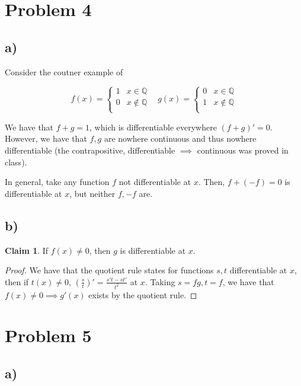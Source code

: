 \documentclass[12pt,letterpaper]{article}
\theoremstyle{definition}
\newtheorem*{claim}{Claim}
\newcommand{\Q}{\mathbb{Q}}
\begin{document}
\section*{Problem 4}

\subsection*{a)}

Consider the coutner example of

\[
  f(x) = \begin{cases}
    1 & x \in \Q \\
    0 & x \notin \Q \\
  \end{cases}
  \ \ \ \ 
  g(x) = \begin{cases}
    0 & x \in \Q \\
    1 & x \notin \Q \\
  \end{cases}
\]

We have that $f + g = 1$, which is differentiable everywhere $(f + g)' = 0$.
However, we have that $f,g$ are nowhere continuous and thus nowhere
differentiable (the contrapositive, differentiable $\implies$ continuous was
proved in class).

In general, take any function $f$ not differentiable at $x$. Then, $f + (-f) =
0$ is differentiable at $x$, but neither $f, -f$ are.

\subsection*{b)}

\begin{claim}
  If $f(x) \neq 0$, then $g$ is differentiable at $x$.
\end{claim}

\begin{proof}
  We have that the quotient rule states for functions $s,t$ differentiable at
  $x$, then if $t(x) \neq 0$, $(\frac{s}{t})' = \frac{s't - st'}{t^2}$ at $x$.
  Taking $s = fg, t = f$, we have that $f(x) \neq 0 \implies g'(x)$ exists by
  the quotient rule.
\end{proof}

\section*{Problem 5}

\subsection*{a)}
\end{document}

